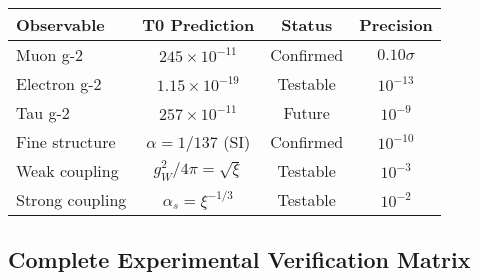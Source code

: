 \documentclass[12pt,a4paper]{article}
\begin{document}
	\begin{center}
		\begin{tabular}{|l|c|c|c|}
			\hline
			\textbf{Observable} & \textbf{T0 Prediction} & \textbf{Status} & \textbf{Precision} \\
			\hline
			Muon g-2 & $245 \times 10^{-11}$ & Confirmed & $0.10\sigma$ \\
			Electron g-2 & $1.15 \times 10^{-19}$ & Testable & $10^{-13}$ \\
			Tau g-2 & $257 \times 10^{-11}$ & Future & $10^{-9}$ \\
			Fine structure & $\alpha = 1/137$ (SI) & Confirmed & $10^{-10}$ \\
			Weak coupling & $g_W^2/4\pi = \sqrt{\xi}$ & Testable & $10^{-3}$ \\
			Strong coupling & $\alpha_s = \xi^{-1/3}$ & Testable & $10^{-2}$ \\
			\hline
		\end{tabular}
	\end{center}

\subsection{Complete Experimental Verification Matrix}
\end{document}

